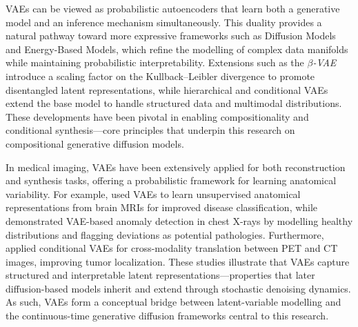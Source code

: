 VAEs can be viewed as probabilistic autoencoders that learn both a generative model and an inference mechanism simultaneously. This duality provides a natural pathway toward more expressive frameworks such as Diffusion Models and Energy-Based Models, which refine the modelling of complex data manifolds while maintaining probabilistic interpretability. Extensions such as the \textit{$\beta$-VAE} \cite{higgins2017beta_vae} introduce a scaling factor on the Kullback–Leibler divergence to promote disentangled latent representations, while hierarchical and conditional VAEs extend the base model to handle structured data and multimodal distributions. These developments have been pivotal in enabling compositionality and conditional synthesis—core principles that underpin this research on compositional generative diffusion models.  

\vspace{1em}

In medical imaging, VAEs have been extensively applied for both reconstruction and synthesis tasks, offering a probabilistic framework for learning anatomical variability. For example, \cite{chartsias2018vae_mri} used VAEs to learn unsupervised anatomical representations from brain MRIs for improved disease classification, while \cite{jimenez2020vae_cxr} demonstrated VAE-based anomaly detection in chest X-rays by modelling healthy distributions and flagging deviations as potential pathologies. Furthermore, \cite{xiang2021vae_petct} applied conditional VAEs for cross-modality translation between PET and CT images, improving tumor localization. These studies illustrate that VAEs capture structured and interpretable latent representations—properties that later diffusion-based models inherit and extend through stochastic denoising dynamics. As such, VAEs form a conceptual bridge between latent-variable modelling and the continuous-time generative diffusion frameworks central to this research.  

